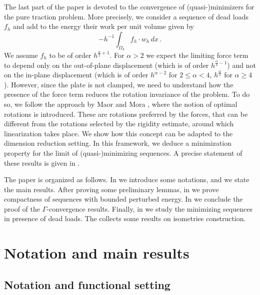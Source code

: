 \documentclass{article}
\theoremstyle{plain}
\theoremstyle{plain}
\theoremstyle{plain}
\theoremstyle{plain}
\theoremstyle{plain}
\theoremstyle{definition}
\theoremstyle{definition}
\begin{document}
The last part of the paper is devoted to the convergence of (quasi-)minimizers for the pure traction problem. More precisely, we consider a sequence of dead loads $f_h$ and add to the energy their work per unit volume given by
\begin{equation}
	- h^{-1}\int_{\Omega_h} f_h \cdot w_h \, dx \,.
\end{equation}
We assume $ f_{h} $ to be of order $ h^{\frac{\alpha}{2}+1} $. For $ \alpha > 2 $ we expect the limiting force term to depend only on the out-of-plane displacement (which is of order $ h^{\frac{\alpha}{2}-1} $) and not on the in-plane  displacement (which is of order  $ h^{\alpha-2} $ for $ 2 \leq \alpha<4 $, $ h^{ \frac{ \alpha  }{ 2 }  }  $ for $ \alpha  \geq  4 $). However, since the plate is not clamped, we need to understand how the presence of the force term reduces the rotation invariance of the problem. To do so, we follow the approach by Maor and Mora \cite{MAOR2021}, where the notion of optimal rotations is introduced. These are rotations preferred by the forces, that can be different from the rotations selected by the rigidity estimate, around which linearization takes place.
We show how this concept can be adapted to the dimension reduction setting. In this framework, we deduce a minimization property for the limit of (quasi-)minimizing sequences. A precise statement of these results is given in .

The paper is organized as follows. In  we introduce some notations, and we state the main results. After proving some preliminary lemmas, in  we prove compactness of sequences with bounded perturbed energy. In  we conclude the proof of the $\Gamma$-convergence results. Finally, in  we study the minimizing sequences in presence of dead loads. The  collects some results on isometries construction.


\section{Notation and main results} \label{section:notations}

\subsection{Notation and functional setting}
\end{document}
